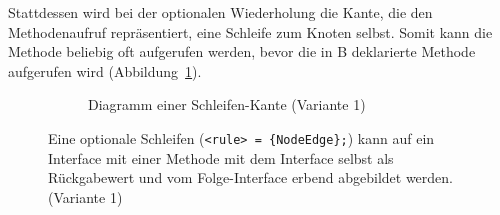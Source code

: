 \documentclass[../InterneDSLs.tex]{subfiles}
\begin{document}
Stattdessen wird bei der optionalen Wiederholung die Kante, die den Methodenaufruf repräsentiert, eine Schleife zum Knoten selbst. Somit kann die Methode beliebig oft aufgerufen werden, bevor die in B deklarierte Methode aufgerufen wird (Abbildung~\ref{FIG:DiagramLoopNode}).
\begin{figure}[ht]
\centering
  \begin{subfigure}[c]{0.49\textwidth}
    \caption{Diagramm einer Schleifen-Kante (Variante 1)}
    \label{FIG:DiagramLoopNode}
  \end{subfigure}
  \begin{subfigure}[c]{0.49\textwidth}
    
  \end{subfigure}
  \caption{Eine optionale Schleifen (\texttt{<rule> = \{NodeEdge\};}) kann auf ein Interface mit einer Methode mit dem Interface selbst als Rückgabewert und vom Folge-Interface erbend abgebildet werden. (Variante 1)}
  \label{FIG:LoopNode}
\end{figure}
\end{document}
